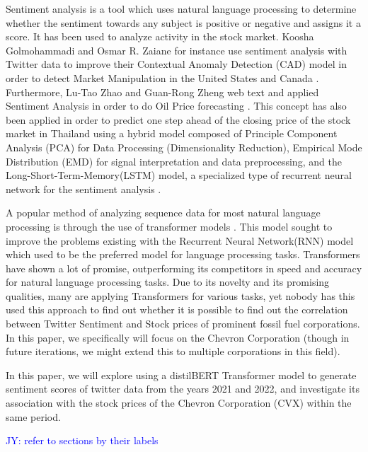\documentclass[12pt, letterpaper, titlepage]{article}
\newcommand{\jy}[1]{\textcolor{blue}{JY: #1}}
\begin{document}
Sentiment analysis \citep{medhat2014sentiment} is a tool which uses natural language processing to determine whether the sentiment towards any subject is positive or negative and assigns it a score. It has been used to analyze activity in the stock market. Koosha Golmohammadi and Osmar R. Zaiane for instance use sentiment analysis with Twitter data to improve their Contextual Anomaly Detection (CAD) model in order to detect Market Manipulation in the United States and Canada \citep{golmohammadi2017sentiment}. Furthermore, Lu-Tao Zhao and Guan-Rong Zheng web text and applied Sentiment Analysis in order to do Oil Price forecasting \citep{zhao2019forecasting}. This concept has also been applied in order to predict one step ahead of the closing price of the stock market in Thailand using a hybrid model composed of Principle Component Analysis (PCA) for Data Processing (Dimensionality Reduction), Empirical Mode Distribution (EMD) for signal interpretation and data preprocessing, and the Long-Short-Term-Memory(LSTM) model, a specialized type of recurrent neural network for the sentiment analysis \citep{srijiranon2022hybrid}.

A popular method of analyzing sequence data for most natural language processing is through the use of transformer models  \citep{vaswani2017attention}. This model sought to improve the problems existing with the Recurrent Neural Network(RNN) model which used to be the preferred model for language processing tasks. Transformers have shown a lot of promise, outperforming its competitors in speed and accuracy for natural language processing tasks. Due to its novelty and its promising qualities, many are applying Transformers for various tasks, yet nobody has this used this approach to find out whether it is possible to find out the correlation between Twitter Sentiment and Stock prices of prominent fossil fuel corporations. In this paper, we specifically will focus on the Chevron Corporation (though in future iterations, we might extend this to multiple corporations in this field).

In this paper, we will explore using a distilBERT Transformer model to generate sentiment scores of twitter data from the years 2021 and 2022, and investigate its association with the stock prices of the Chevron Corporation (CVX) within the same period.

\jy{refer to sections by their labels}
\end{document}
